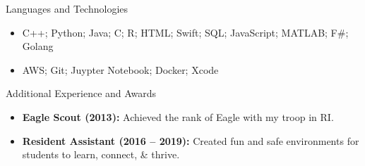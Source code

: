 \documentclass[]{mcdowellcv}
\begin{document}
	\begin{cvsection}{Languages and Technologies}
		\begin{cvsubsection}{}{}{}	
			\begin{itemize}
				\item C++; Python; Java; C; R; HTML; Swift; SQL; JavaScript; MATLAB; F\#; Golang
				\item AWS; Git; Juypter Notebook; Docker; Xcode
			\end{itemize}
		\end{cvsubsection}
	\end{cvsection}

	\begin{cvsection}{Additional Experience and Awards}
		\begin{cvsubsection}{}{}{}	
			\begin{itemize}
				\item \textbf{Eagle Scout (2013):} Achieved the rank of Eagle with my troop in RI.
				\item \textbf{Resident Assistant (2016 -- 2019):} Created fun and safe environments for students to learn, connect, \& thrive.
			\end{itemize}
		\end{cvsubsection}
	\end{cvsection}
		
\end{document}

